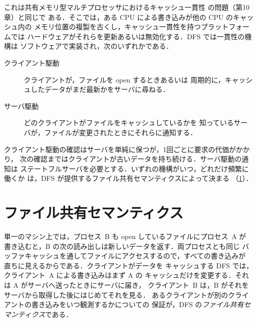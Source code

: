 \documentclass[../main.tex]{subfiles}
\begin{document}
これは共有メモリ型マルチプロセッサにおけるキャッシュ一貫性
の問題（第10章）と同じで
ある．そこでは，ある CPU による書き込みが他の CPU のキャッシュ内の
メモリ位置の複製を古くし，キャッシュ一貫性を持つプラットフォームでは
ハードウェアがそれらを更新あるいは無効化する．DFS では一貫性の機構は
ソフトウェアで実装され，次のいずれかである．
\begin{description}
  \item[クライアント駆動] クライアントが，ファイルを open するときあるいは
    周期的に，キャッシュしたデータがまだ最新かをサーバに尋ねる．
  \item[サーバ駆動] どのクライアントがファイルをキャッシュしているかを
    知っているサーバが，ファイルが変更されたときにそれらに通知する．
\end{description}
クライアント駆動の確認はサーバを単純に保つが，1回ごとに要求の代価がかかり，
次の確認まではクライアントが古いデータを持ち続ける．サーバ駆動の通知は
ステートフルサーバを必要とする．いずれの機構がいつ，どれだけ頻繁に働くか
は，DFS が提供するファイル共有セマンティクスによって決まる
（\cref{sec:l14-semantics}）．

\section{ファイル共有セマンティクス}
\label{sec:l14-semantics}

単一のマシン上では，プロセス~B も open しているファイルにプロセス~A が
書き込むと，B の次の読み出しは新しいデータを返す．両プロセスとも同じ
バッファキャッシュを通してファイルにアクセスするので，すべての書き込みが
直ちに見えるからである．クライアントがデータを
キャッシュする DFS では，クライアント~A による書き込みはまず A の
キャッシュだけを変更する．それは A がサーバへ送ったときにサーバに届き，
クライアント~B は，B がそれをサーバから取得した後にはじめてそれを見る．
あるクライアントが別のクライアントの書き込みをいつ観測するかについての
保証が，DFS の\emph{ファイル共有セマンティクス}である．
\end{document}

